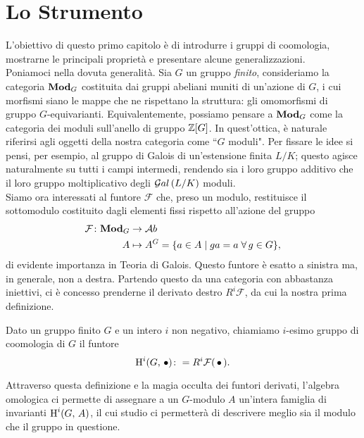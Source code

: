 \chapter{Lo Strumento}
\small

L'obiettivo di questo primo capitolo è di introdurre i gruppi di coomologia, mostrarne le principali proprietà e presentare alcune generalizzazioni.\\

Poniamoci nella dovuta generalità. Sia $ G $ un gruppo \emph{finito}, consideriamo la categoria $ \mathbf{Mod}_G $ costituita dai gruppi abeliani muniti di un'azione di $ G $, i cui morfismi siano le mappe che ne rispettano la struttura: gli omomorfismi di gruppo $ G $-equivarianti. Equivalentemente, possiamo pensare a $ \mathbf{Mod}_G $ come la categoria dei moduli sull'anello di gruppo $ \mathbb{Z}[G] $. In quest'ottica, è naturale riferirsi agli oggetti della nostra categoria come \textquotedblleft$ G $ moduli".
Per fissare le idee si pensi, per esempio, al gruppo di Galois di un'estensione finita $ L/K $; questo agisce naturalmente su tutti i campi intermedi, rendendo sia i loro gruppo additivo che il loro gruppo moltiplicativo degli $ \mathcal{G}al\left( L/K \right) $ moduli. \\

Siamo ora interessati al funtore $ \mathcal{F} $ che, preso un modulo, restituisce il sottomodulo costituito dagli elementi fissi rispetto  all'azione del gruppo
\begin{align*} 
\mathcal{F} \colon \mathbf{Mod}_G &\to \mathcal{A}b \\
A &\mapsto A^G = \{ a \in A \mid ga = a \; \forall \, g \in G \},
\end{align*}
di evidente importanza in Teoria di Galois. Questo funtore è esatto a sinistra ma, in generale, non a destra. Partendo questo da una categoria con abbastanza iniettivi, ci è concesso prenderne il derivato destro $ R^i\mathcal{F} $, da cui la nostra prima definizione.

\begin{definition}
	Dato un gruppo finito $ G $ e un intero $ i $ non negativo, chiamiamo $ i $-esimo gruppo di coomologia di $ G $ il funtore
	\[ \operatorname{H}^i(G, \, \bullet) \colon = R^i\mathcal{F}(\,\bullet\,). \]
\end{definition}

Attraverso questa definizione e la magia occulta dei funtori derivati, l'algebra omologica ci permette di assegnare a un $ G $-modulo $ A $ un'intera famiglia di invarianti $ \operatorname{H}^i(G, \, A) $, il cui studio ci permetterà di descrivere meglio sia il modulo che il gruppo in questione. 

